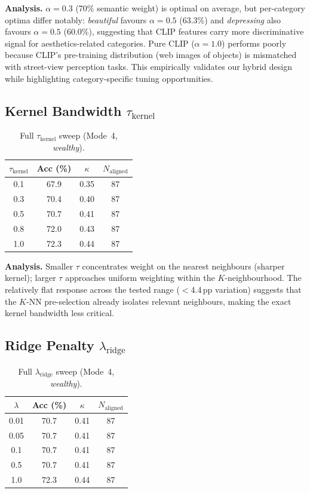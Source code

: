\documentclass[runningheads]{llncs}
\begin{document}
\noindent\textbf{Analysis.}
$\alpha{=}0.3$ (70\% semantic weight) is optimal on average, but per-category optima differ notably: \emph{beautiful} favours $\alpha{=}0.5$ (63.3\%) and \emph{depressing} also favours $\alpha{=}0.5$ (60.0\%), suggesting that CLIP features carry more discriminative signal for aesthetics-related categories.
Pure CLIP ($\alpha{=}1.0$) performs poorly because CLIP's pre-training distribution (web images of objects) is mismatched with street-view perception tasks.
This empirically validates our hybrid design while highlighting category-specific tuning opportunities.

\subsection{Kernel Bandwidth $\tau_{\mathrm{kernel}}$}

\begin{table}[ht]
\centering
\caption{Full $\tau_{\mathrm{kernel}}$ sweep (Mode~4, \emph{wealthy}).}
\label{tab:tau_sweep}
\small
\begin{tabular}{cccc}
\toprule
$\tau_{\mathrm{kernel}}$ & Acc (\%) & $\kappa$ & $N_{\mathrm{aligned}}$ \\
\midrule
0.1 & 67.9 & 0.35 & 87 \\
0.3 & 70.4 & 0.40 & 87 \\
0.5 & 70.7 & 0.41 & 87 \\
0.8 & 72.0 & 0.43 & 87 \\
1.0 & 72.3 & 0.44 & 87 \\
\bottomrule
\end{tabular}
\end{table}

\noindent\textbf{Analysis.}
Smaller $\tau$ concentrates weight on the nearest neighbours (sharper kernel); larger $\tau$ approaches uniform weighting within the $K$-neighbourhood.
The relatively flat response across the tested range ($<$4.4\,pp variation) suggests that the $K$-NN pre-selection already isolates relevant neighbours, making the exact kernel bandwidth less critical.

\subsection{Ridge Penalty $\lambda_{\mathrm{ridge}}$}

\begin{table}[ht]
\centering
\caption{Full $\lambda_{\mathrm{ridge}}$ sweep (Mode~4, \emph{wealthy}).}
\label{tab:lambda_sweep}
\small
\begin{tabular}{cccc}
\toprule
$\lambda$ & Acc (\%) & $\kappa$ & $N_{\mathrm{aligned}}$ \\
\midrule
0.01 & 70.7 & 0.41 & 87 \\
0.05 & 70.7 & 0.41 & 87 \\
0.1  & 70.7 & 0.41 & 87 \\
0.5  & 70.7 & 0.41 & 87 \\
1.0  & 72.3 & 0.44 & 87 \\
\bottomrule
\end{tabular}
\end{table}
\end{document}
